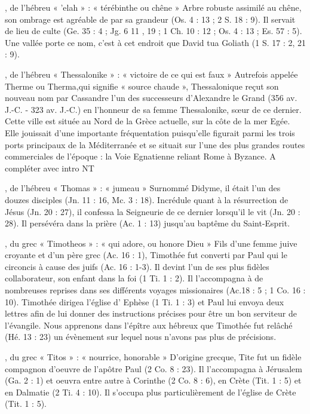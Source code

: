 \begin{multicols}{2}
, de l'hébreu « 'elah » : « térébinthe ou chêne »
Arbre robuste assimilé au chêne, son ombrage est agréable de par sa grandeur (Os. 4 : 13 ; 2 S. 18 : 9). Il servait de lieu de culte (Ge. 35 : 4 ; Jg. 6 11 , 19 ; 1 Ch. 10 : 12 ; Os. 4 : 13 ; Es. 57 : 5). Une vallée porte ce nom, c'est à cet endroit que David tua Goliath (1 S. 17 : 2, 21 : 9).


, de l'hébreu « Thessalonike » : « victoire de ce qui est faux »
Autrefois appelée Therme ou Therma,qui signifie « source chaude », Thessalonique reçut son nouveau nom par Cassandre l’un des successeurs d’Alexandre le Grand (356 av. J.-C. - 323 av. J.-C.) en l’honneur de sa femme Thessalonike, sœur de ce dernier. Cette ville est située au Nord de la Grèce actuelle, sur la côte de la mer Egée. Elle jouissait d’une importante fréquentation puisqu’elle figurait parmi les trois ports principaux de la Méditerranée et se situait sur l’une des plus grandes routes commerciales de l’époque : la Voie Egnatienne reliant Rome à Byzance. A compléter avec intro NT


, de l'hébreu « Thomas » : « jumeau »
Surnommé Didyme, il était l'un des douzes disciples (Jn. 11 : 16, Mc. 3 : 18). Incrédule quant à la résurrection de Jésus (Jn. 20 : 27), il confessa la Seigneurie de ce dernier lorsqu'il le vit (Jn. 20 : 28). Il persévéra dans la prière (Ac. 1 : 13) jusqu'au baptême du Saint-Esprit.


, du grec « Timotheos » : « qui adore, ou honore Dieu »
Fils d'une femme juive croyante et d'un père grec (Ac. 16 : 1), Timothée fut converti par Paul qui le circoncis à cause des juifs (Ac. 16 : 1-3). Il devint l'un de ses plus fidèles collaborateur, son enfant dans la foi (1 Ti. 1 : 2). Il l'accompagna à de nombreuses reprises dans ses différents voyages missionaires (Ac.18 : 5 ; 1 Co. 16 : 10). Timothée dirigea l'église d' Ephèse (1 Ti. 1 : 3) et Paul lui envoya deux lettres afin de lui donner des instructions précises pour être un bon serviteur de l'évangile. Nous apprenons dans l'épître aux hébreux que Timothée fut relâché (Hé. 13 : 23) un évènement sur lequel nous n'avons pas plus de précisions.


, du grec « Titos » : « nourrice, honorable »
D'origine grecque, Tite fut un fidèle compagnon d'oeuvre de l'apôtre Paul (2 Co. 8 : 23). Il l'accompagna à Jérusalem (Ga. 2 : 1) et oeuvra entre autre à Corinthe (2 Co. 8 : 6), en Crète (Tit. 1 : 5) et en Dalmatie (2 Ti. 4 : 10). Il s'occupa plus particulièrement de l'église de Crète (Tit. 1 : 5).



\end{multicols}
